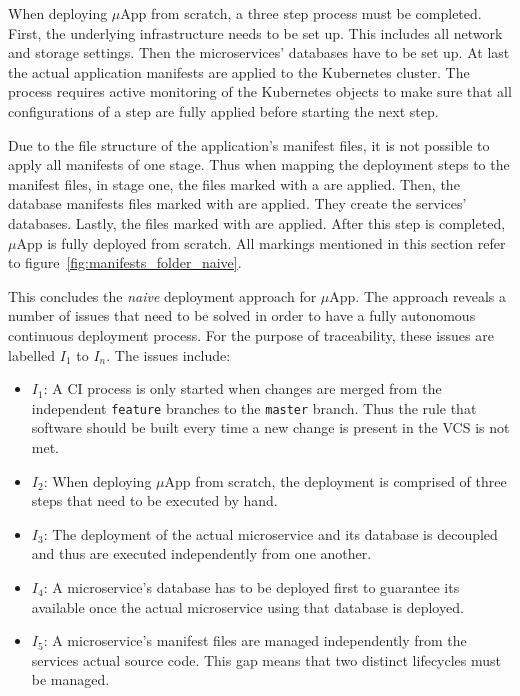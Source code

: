 When deploying $\mu$App from scratch, a three step process must be completed.
First, the underlying infrastructure needs to be set up. This includes all
network and storage settings. Then the microservices' databases have to be set
up. At last the actual application manifests are applied to the Kubernetes
cluster. The process requires active monitoring of the Kubernetes objects to
make sure that all configurations of a step are fully applied before starting
the next step.

Due to the file structure of the application's manifest files, it is not
possible to apply all manifests of one stage. Thus when mapping the deployment
steps to the manifest files, in stage one, the files marked with a
\inlineDiamond{} are applied. Then, the database manifests files marked with
\inlineRectangle{} are applied. They create the services' databases. Lastly,
the files marked with \inlineTriangle{} are applied. After this step is
completed, $\mu$App is fully deployed from scratch. All markings mentioned in
this section refer to figure~\ref{fig:manifests_folder_naive}.

This concludes the \textit{naive} deployment approach for $\mu$App. The
approach reveals a number of issues that need to be solved in order to have a
fully autonomous continuous deployment process. For the purpose of
traceability, these issues are labelled $I_1$ to $I_n$. The issues include:

\begin{itemize}
  \item \textit{$I_1$}: A \ac{CI} process is only started when changes are merged from the
    independent \texttt{feature} branches to the \texttt{master} branch. Thus
    the rule that software should be built every time a new change is present
    in the \ac{VCS} is not met.
  \item \textit{$I_2$}: When deploying $\mu$App from scratch, the deployment is comprised of
    three steps that need to be executed by hand.
  \item \textit{$I_3$}: The deployment of the actual microservice and its database is decoupled
    and thus are executed independently from one another.
  \item \textit{$I_4$}: A microservice's database has to be deployed first to guarantee its
    available once the actual microservice using that database is deployed.
  \item \textit{$I_5$}: A microservice's manifest files are managed independently from the
    services actual source code. This gap means that two distinct lifecycles
    must be managed.
\end{itemize}


